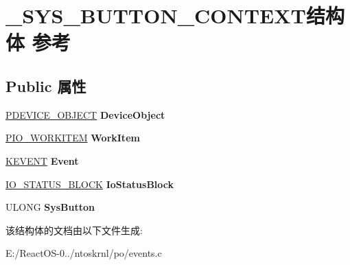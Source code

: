\hypertarget{struct___s_y_s___b_u_t_t_o_n___c_o_n_t_e_x_t}{}\section{\+\_\+\+S\+Y\+S\+\_\+\+B\+U\+T\+T\+O\+N\+\_\+\+C\+O\+N\+T\+E\+X\+T结构体 参考}
\label{struct___s_y_s___b_u_t_t_o_n___c_o_n_t_e_x_t}
\subsection*{Public 属性}
\begin{DoxyCompactItemize}
\item 
\mbox{\label{struct___s_y_s___b_u_t_t_o_n___c_o_n_t_e_x_t_ab8aca4558ba38d025ea169d0f0b7f4f4}} 
\hyperlink{struct___d_e_v_i_c_e___o_b_j_e_c_t}{P\+D\+E\+V\+I\+C\+E\+\_\+\+O\+B\+J\+E\+CT} {\bfseries Device\+Object}
\item 
\mbox{\label{struct___s_y_s___b_u_t_t_o_n___c_o_n_t_e_x_t_a986df5b016d3b5aaf50239b11f146f41}} 
\hyperlink{struct___i_o___w_o_r_k_i_t_e_m}{P\+I\+O\+\_\+\+W\+O\+R\+K\+I\+T\+EM} {\bfseries Work\+Item}
\item 
\mbox{\label{struct___s_y_s___b_u_t_t_o_n___c_o_n_t_e_x_t_aa7c708687270dc651d38097f4dee9311}} 
\hyperlink{struct___k_e_v_e_n_t}{K\+E\+V\+E\+NT} {\bfseries Event}
\item 
\mbox{\label{struct___s_y_s___b_u_t_t_o_n___c_o_n_t_e_x_t_a9983e06dfe2d797dea0aae89111b149c}} 
\hyperlink{struct___i_o___s_t_a_t_u_s___b_l_o_c_k}{I\+O\+\_\+\+S\+T\+A\+T\+U\+S\+\_\+\+B\+L\+O\+CK} {\bfseries Io\+Status\+Block}
\item 
\mbox{\label{struct___s_y_s___b_u_t_t_o_n___c_o_n_t_e_x_t_a0a71a336794abf8af5eb0de538d0c989}} 
U\+L\+O\+NG {\bfseries Sys\+Button}
\end{DoxyCompactItemize}


该结构体的文档由以下文件生成\+:\begin{DoxyCompactItemize}
\item 
E\+:/\+React\+O\+S-\/0../ntoskrnl/po/events.\+c\end{DoxyCompactItemize}

